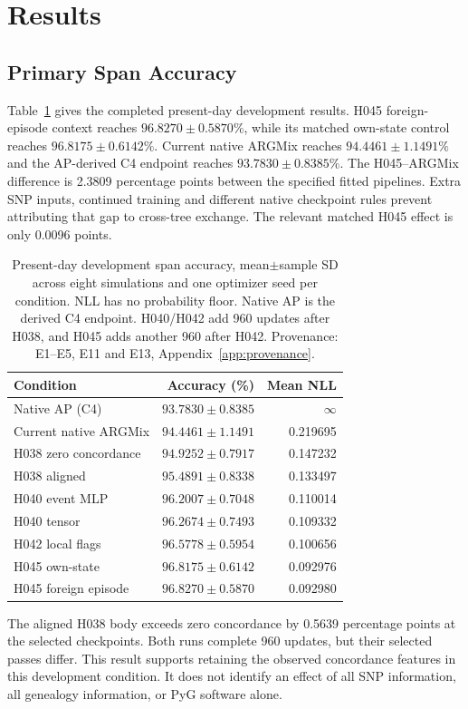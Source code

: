 \documentclass[letterpaper]{article}
\begin{document}
\section{Results}
\subsection{Primary Span Accuracy}
Table~\ref{tab:primary} gives the completed present-day development results. H045 foreign-episode context reaches $96.8270\pm0.5870\%$, while its matched own-state control reaches $96.8175\pm0.6142\%$. Current native ARGMix reaches $94.4461\pm1.1491\%$ and the AP-derived C4 endpoint reaches $93.7830\pm0.8385\%$. The H045--ARGMix difference is 2.3809 percentage points between the specified fitted pipelines. Extra SNP inputs, continued training and different native checkpoint rules prevent attributing that gap to cross-tree exchange. The relevant matched H045 effect is only 0.0096 points.

\begin{table}[t]
\centering
\small
\begin{tabular}{lrr}
\toprule
Condition & Accuracy (\%) & Mean NLL \\
\midrule
Native AP (C4) & $93.7830\pm0.8385$ & $\infty$ \\
Current native ARGMix & $94.4461\pm1.1491$ & 0.219695 \\
H038 zero concordance & $94.9252\pm0.7917$ & 0.147232 \\
H038 aligned & $95.4891\pm0.8338$ & 0.133497 \\
H040 event MLP & $96.2007\pm0.7048$ & 0.110014 \\
H040 tensor & $96.2674\pm0.7493$ & 0.109332 \\
H042 local flags & $96.5778\pm0.5954$ & 0.100656 \\
H045 own-state & $96.8175\pm0.6142$ & 0.092976 \\
H045 foreign episode & $96.8270\pm0.5870$ & 0.092980 \\
\bottomrule
\end{tabular}
\caption{Present-day development span accuracy, mean$\pm$sample SD across eight simulations and one optimizer seed per condition. NLL has no probability floor. Native AP is the derived C4 endpoint. H040/H042 add 960 updates after H038, and H045 adds another 960 after H042. Provenance: E1--E5, E11 and E13, Appendix~\ref{app:provenance}.}
\label{tab:primary}
\end{table}


The aligned H038 body exceeds zero concordance by 0.5639 percentage points at the selected checkpoints. Both runs complete 960 updates, but their selected passes differ. This result supports retaining the observed concordance features in this development condition. It does not identify an effect of all SNP information, all genealogy information, or PyG software alone.
\end{document}

